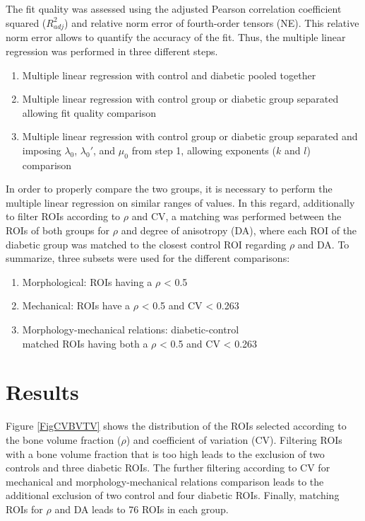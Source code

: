 \documentclass[a4paper,fleqn]{DC_ArtStyle}
\begin{document}
	The fit quality was assessed using the adjusted Pearson correlation coefficient squared ($R_{adj}^{2}$) and relative norm error of fourth-order tensors (NE).
	This relative norm error allows to quantify the accuracy of the fit.
	Thus, the multiple linear regression was performed in three different steps.
	\begin{enumerate}
		\item Multiple linear regression with control and diabetic pooled together
		\item Multiple linear regression with control group or diabetic group separated allowing fit quality comparison
		\item Multiple linear regression with control group or diabetic group separated and imposing $\lambda_0$, $\lambda_0'$, and $\mu_0$ from step 1, allowing exponents ($k$ and $l$) comparison
	\end{enumerate}
	In order to properly compare the two groups, it is necessary to perform the multiple linear regression on similar ranges of values.
	In this regard, additionally to filter ROIs according to $\rho$ and CV, a matching was performed between the ROIs of both groups for $\rho$ and degree of anisotropy (DA), where each ROI of the diabetic group was matched to the closest control ROI regarding $\rho$ and DA.
	To summarize, three subsets were used for the different comparisons:
	\begin{enumerate}
		\item Morphological: ROIs having a $\rho$ < 0.5
		\item Mechanical: ROIs have a $\rho$ < 0.5 and CV < 0.263
		\item Morphology-mechanical relations: diabetic-control\\matched ROIs having both a $\rho$ < 0.5 and CV < 0.263
	\end{enumerate}


	\section{Results}
	Figure \ref{FigCVBVTV} shows the distribution of the ROIs selected according to the bone volume fraction ($\rho$) and coefficient of variation (CV).
	Filtering ROIs with a bone volume fraction that is too high leads to the exclusion of two controls and three diabetic ROIs.
	The further filtering according to CV for mechanical and morphology-mechanical relations comparison leads to the additional exclusion of two control and four diabetic ROIs.
	Finally, matching ROIs for $\rho$ and DA leads to 76 ROIs in each group.
   
\end{document}
